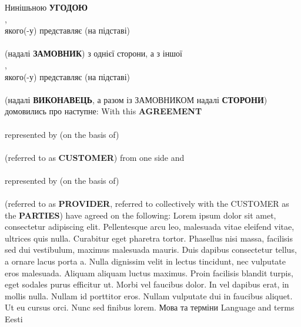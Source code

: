\begin{Form}
    \begin{paracol}{3}
      \freetext %
        {Нинішьною \textbf{УГОДОЮ}\\
          ,\\
          якого(-у) представляє (на підставі)\\
          \\
          (надалі \textbf{ЗАМОВНИК}) з однієї сторони, а з іншої\\
          ,\\
          якого(-у) представляє (на підставі)\\
          \\
          (надалі \textbf{ВИКОНАВЕЦЬ}, а разом із ЗАМОВНИКОМ надалі \textbf{СТОРОНИ}) домовились про наступне:
        }
        { With this \textbf{AGREEMENT}\\
          \\
          represented by (on the basis of)\\
          \\
          (referred to as \textbf{CUSTOMER}) from one side and\\
          \\
          represented by (on the basis of)\\
          \\
          (referred to as \textbf{PROVIDER}, referred to collectively with the CUSTOMER as the \textbf{PARTIES}) have agreed on the following:
          }
        {Lorem ipsum dolor sit amet, consectetur adipiscing elit. Pellentesque arcu leo, malesuada vitae eleifend vitae, ultrices quis nulla. Curabitur eget pharetra tortor. Phasellus nisi massa, facilisis sed dui vestibulum, maximus malesuada mauris. Duis dapibus consectetur tellus, a ornare lacus porta a. Nulla dignissim velit in lectus tincidunt, nec vulputate eros malesuada. Aliquam aliquam luctus maximus. Proin facilisis blandit turpis, eget sodales purus efficitur ut. Morbi vel faucibus dolor. In vel dapibus erat, in mollis nulla. Nullam id porttitor eros. Nullam vulputate dui in faucibus aliquet. Ut eu cursus orci. Nunc sed finibus lorem.}
      \clause
        {Мова та терміни}
        {Language and terms}
        {Eesti}

\end{paracol}
\end{Form}
